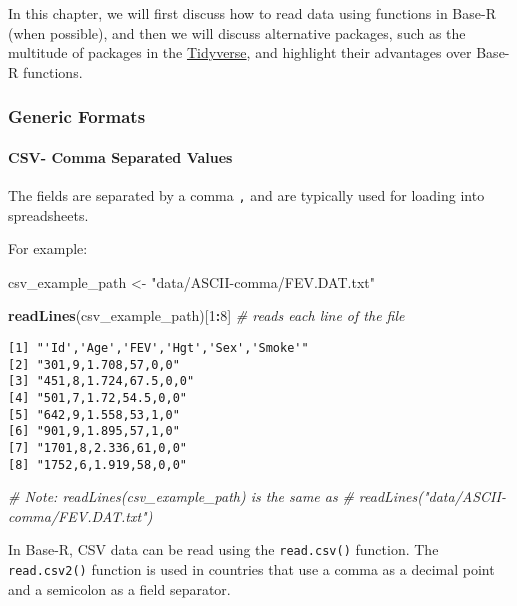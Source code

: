 \documentclass[12pt,]{article}
\newenvironment{Shaded}{\begin{snugshade}}{\end{snugshade}}
\newcommand{\CommentTok}[1]{\textcolor[rgb]{0.56,0.35,0.01}{\textit{#1}}}
\newcommand{\DecValTok}[1]{\textcolor[rgb]{0.00,0.00,0.81}{#1}}
\newcommand{\KeywordTok}[1]{\textcolor[rgb]{0.13,0.29,0.53}{\textbf{#1}}}
\newcommand{\NormalTok}[1]{#1}
\newcommand{\OperatorTok}[1]{\textcolor[rgb]{0.81,0.36,0.00}{\textbf{#1}}}
\newcommand{\StringTok}[1]{\textcolor[rgb]{0.31,0.60,0.02}{#1}}
\let\oldparagraph\paragraph
\renewcommand{\paragraph}[1]{\oldparagraph{#1}\mbox{}}
\begin{document}
In this chapter, we will first discuss how to read data using functions
in Base-R (when possible), and then we will discuss alternative
packages, such as the multitude of packages in the
\href{https://www.tidyverse.org}{Tidyverse}, and highlight their
advantages over Base-R functions.

\hypertarget{generic-formats}{%
\subsubsection{Generic Formats}\label{generic-formats}}

\hypertarget{csv--comma-separated-values}{%
\paragraph{CSV- Comma Separated
Values}\label{csv--comma-separated-values}}

The fields are separated by a comma \texttt{,} and are typically used
for loading into spreadsheets.

For example:

\begin{Shaded}
\begin{Highlighting}[]
\NormalTok{csv_example_path <-}\StringTok{ "data/ASCII-comma/FEV.DAT.txt"}

\KeywordTok{readLines}\NormalTok{(csv_example_path)[}\DecValTok{1}\OperatorTok{:}\DecValTok{8}\NormalTok{]  }\CommentTok{# reads each line of the file}
\end{Highlighting}
\end{Shaded}

\begin{verbatim}
[1] "'Id','Age','FEV','Hgt','Sex','Smoke'"
[2] "301,9,1.708,57,0,0"                  
[3] "451,8,1.724,67.5,0,0"                
[4] "501,7,1.72,54.5,0,0"                 
[5] "642,9,1.558,53,1,0"                  
[6] "901,9,1.895,57,1,0"                  
[7] "1701,8,2.336,61,0,0"                 
[8] "1752,6,1.919,58,0,0"                 
\end{verbatim}

\begin{Shaded}
\begin{Highlighting}[]
\CommentTok{# Note: readLines(csv_example_path) is the same as}
\CommentTok{# readLines("data/ASCII-comma/FEV.DAT.txt")}
\end{Highlighting}
\end{Shaded}

In Base-R, CSV data can be read using the \texttt{read.csv()} function.
The \texttt{read.csv2()} function is used in countries that use a comma
as a decimal point and a semicolon as a field separator.
\end{document}
